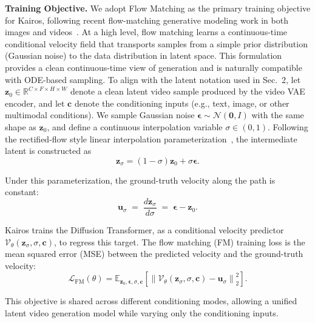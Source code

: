 \documentclass{llmxive}
\providecommand{\bm}[1]{\boldsymbol{#1}}
\begin{document}
\textbf{Training Objective.} 
We adopt Flow Matching as the primary training objective for Kairos, following recent flow-matching generative modeling work in both images and videos~\cite{lipman2023flowmatching,rectifiedflow,sd3,hunyuanvideo,opensora2,wan2025}.
At a high level, flow matching learns a continuous-time conditional velocity field that transports samples from a simple prior distribution (Gaussian noise) to the data distribution in latent space.
This formulation provides a clean continuous-time view of generation and is naturally compatible with ODE-based sampling. To align with the latent notation used in Sec.~2, let $\bm{z}_0 \in \mathbb{R}^{C \times F \times H \times W}$ denote a clean latent video sample produced by the video VAE encoder, and let $\bm{c}$ denote the conditioning inputs (e.g., text, image, or other multimodal conditions).
We sample Gaussian noise $\bm{\epsilon} \sim \mathcal{N}(\bm{0}, I)$ with the same shape as $\bm{z}_0$, and define a continuous interpolation variable $\sigma \in (0,1)$.
Following the rectified-flow style linear interpolation parameterization~\cite{rectifiedflow,sd3}, the intermediate latent is constructed as
\begin{equation}
\bm{z}_{\sigma} = (1-\sigma)\bm{z}_0 + \sigma \bm{\epsilon} .
\label{eq:fm_interpolation}
\end{equation}

Under this parameterization, the ground-truth velocity along the path is constant:
\begin{equation}
\bm{u}_{\sigma} \;=\; \frac{d \bm{z}_{\sigma}}{d \sigma} \;=\; \bm{\epsilon} - \bm{z}_0 .
\label{eq:fm_velocity_target}
\end{equation}

Kairos trains the Diffusion Transformer, as a conditional velocity predictor $\mathcal{V}_{\theta}(\bm{z}_{\sigma}, \sigma, \bm{c})$, to regress this target.
The flow matching (FM) training loss is the mean squared error (MSE) between the predicted velocity and the ground-truth velocity:
\begin{equation}
\mathcal{L}_{\mathrm{FM}}(\theta)
=
\mathbb{E}_{\bm{z}_0,\bm{\epsilon},\sigma,\bm{c}}
\left[
\left\|
\mathcal{V}_{\theta}(\bm{z}_{\sigma}, \sigma, \bm{c}) - \bm{u}_{\sigma}
\right\|_2^2
\right].
\label{eq:fm_loss}
\end{equation}

This objective is shared across different conditioning modes, allowing a unified latent video generation model while varying only the conditioning inputs.
\end{document}
